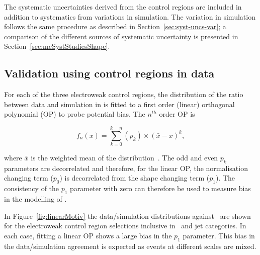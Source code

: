 The systematic uncertainties derived from the control regions
are included in addition to systematics from variations in simulation.
The variation in simulation follows the same procedure as described in
Section~\ref{sec:syst-uncs-var}; a comparison of the different sources of systematic uncertainty
is presented in Section~\ref{sec:mcSystStudiesShape}.

\subsection{Validation using control regions in data}
\label{sec:valid13}

For each of the three electroweak control regions, the distribution of the ratio 
between data and simulation in \mht is fitted to a first order (linear) orthogonal polynomial (OP)
to probe potential bias. The $n^{th}$ order OP is 

\begin{equation}
  \label{equ:orthog-polynomial}
  f_n(x) = \sum_{k=0}^{k=n}{(p_k)\times(\bar{x}-x)^k},
\end{equation}

\noindent where $\bar{x}$ is the weighted mean of the distribution~\cite{cohen2013applied}. 
The odd and even $p_k$ parameters are decorrelated and therefore, for the linear OP,
the normalisation changing term ($p_0$) is decorrelated from the shape changing term ($p_1$).
The consistency of the $p_1$ parameter with zero can therefore be used to measure bias in the
modelling of \mht. 

In Figure~\ref{fig:linearMotiv} the data/simulation
distributions against \mht~are shown for the electroweak control region selections 
inclusive in \scalht~and jet categories. In each case, 
fitting a linear OP shows a large bias in the $p_1$ parameter. 
This bias in the data/simulation agreement is expected as events 
at different scales are mixed. 

